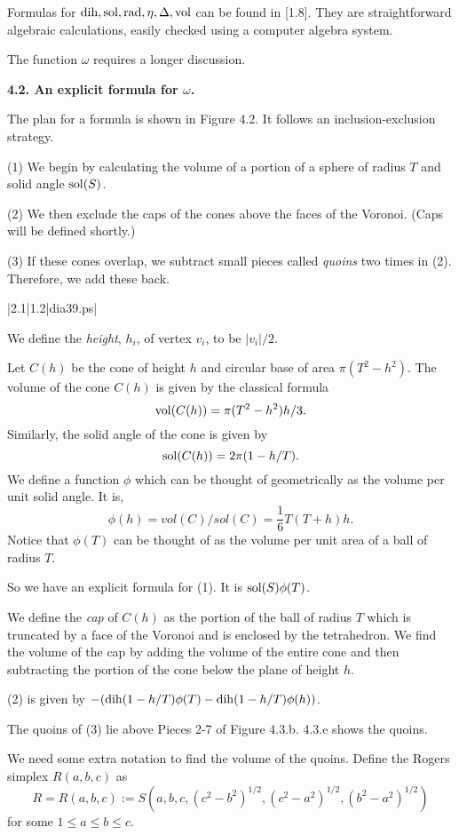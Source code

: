 Formulas for $\operatorname{dih}, \operatorname{sol}, \operatorname{rad}, \eta, \Delta, \operatorname{vol}$  can be found in [1.8].  
They are straightforward algebraic calculations,
 easily checked using a computer algebra system.

The function $\omega$ requires a longer discussion.

\bigskip

{\bf 4.2.  An explicit formula for $\omega$.}

\bigskip

The plan for a formula is shown in Figure 4.2.  It follows an inclusion-exclusion strategy. 

(1) We begin by calculating the volume of a portion of a sphere of radius $T$ and solid 
angle $\operatorname{sol}(S)$.  

(2) We then exclude the 
caps of the cones above the faces of the Voronoi.  (Caps will be defined shortly.)

(3) If these cones 
overlap, we subtract small pieces called {\it quoins} two times in (2).
  Therefore, we add these back.  


\gram|2.1|1.2|dia39.ps|  %


We define the {\it height}, $h_i$, of vertex $v_i$, to be $|v_i|/2$.

Let $C(h)$ be the cone of height $h$ and circular base of area 
$\pi (T^2-h^2)$.
The volume of the cone $C(h)$ is given by the classical formula $$\operatorname{vol}(C(h))=\pi (T^2-h^2) h/3.$$ 
 Similarly, the solid angle of the cone is given by $$\operatorname{sol}(C(h))=2\pi (1-h/T).$$ 
 We define a function $\phi$ which can be thought of geometrically as the volume per 
unit solid angle.  It is, $$\phi(h)=vol(C)/sol(C)=\frac 1 6 T(T+h)h.$$  Notice that 
$\phi(T)$ can be thought of as the volume per unit area of a ball of radius $T$.  

So we have an explicit formula for (1).  It is 
$\operatorname{sol}(S)\phi(T)$.  

We define the {\it cap} of $C(h)$ as the portion of the ball of radius $T$ 
which is truncated by a face of the Voronoi and is enclosed by the tetrahedron.
We find the volume of the cap by adding the volume of the entire cone and then 
subtracting the portion of the cone below the plane of height $h$.

(2) is given by
$-(\operatorname{dih}(1-h/T)\phi(T)-\operatorname{dih}(1-h/T)\phi(h))$.

The quoins of (3) lie above Pieces 2-7 of Figure 4.3.b.  4.3.e shows the quoins.  

We need some extra notation to find the volume of the quoins.
Define the Rogers simplex $R(a,b,c)$ as 
$$R=R(a,b,c):= S(a,b,c,(c^2-b^2)^{1/2},(c^2-a^2)^{1/2},(b^2-a^2)^{1/2})$$
for some $1\le a\le b\le c$.

